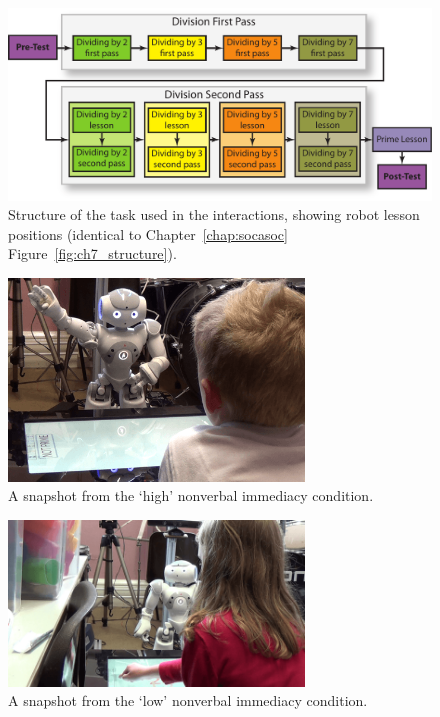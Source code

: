 \begin{figure}[t!]
    \centering
    \includegraphics[width=1.0\textwidth]{images/ch7_task_structure.pdf}
    \caption{Structure of the task used in the interactions, showing robot lesson positions (identical to Chapter~\ref{chap:socasoc} Figure~\ref{fig:ch7_structure}).}
    \label{fig:ch8_structure}
\end{figure}

\begin{figure}[t!]
    \centering
	 \includegraphics[width=0.7\textwidth]{images/ch8_still_IM_comp.png}
    \caption{A snapshot from the `high' nonverbal immediacy condition.}
    \label{fig:ch8_highsnap}
\end{figure}

\begin{figure}[t!]
    \centering
	 \includegraphics[width=0.7\textwidth]{images/ch8_still_NI_comp.png}
    \caption{A snapshot from the `low' nonverbal immediacy condition.}
    \label{fig:ch8_lowsnap}
\end{figure}

